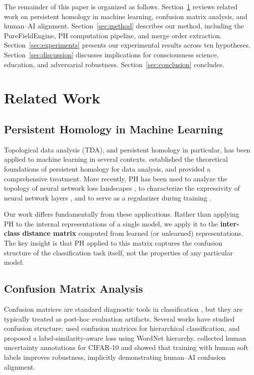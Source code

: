 \documentclass[11pt,a4paper]{article}
\begin{document}
The remainder of this paper is organized as follows. Section~\ref{sec:related} reviews related work on persistent homology in machine learning, confusion matrix analysis, and human--AI alignment. Section~\ref{sec:method} describes our method, including the PureFieldEngine, PH computation pipeline, and merge order extraction. Section~\ref{sec:experiments} presents our experimental results across ten hypotheses. Section~\ref{sec:discussion} discusses implications for consciousness science, education, and adversarial robustness. Section~\ref{sec:conclusion} concludes.

\section{Related Work}
\label{sec:related}

\subsection{Persistent Homology in Machine Learning}

Topological data analysis (TDA), and persistent homology in particular, has been applied to machine learning in several contexts. \citet{carlsson2009} established the theoretical foundations of persistent homology for data analysis, and \citet{edelsbrunner2010} provided a comprehensive treatment. More recently, PH has been used to analyze the topology of neural network loss landscapes \citep{goldfarb2020}, to characterize the expressivity of neural network layers \citep{naitzat2020}, and to serve as a regularizer during training \citep{hofer2019,chen2019}.

Our work differs fundamentally from these applications. Rather than applying PH to the internal representations of a single model, we apply it to the \textbf{inter-class distance matrix} computed from learned (or unlearned) representations. The key insight is that PH applied to this matrix captures the confusion structure of the classification task itself, not the properties of any particular model.

\subsection{Confusion Matrix Analysis}

Confusion matrices are standard diagnostic tools in classification \citep{stehman1997}, but they are typically treated as post-hoc evaluation artifacts. Several works have studied confusion structure: \citet{smith2019} used confusion matrices for hierarchical classification, and \citet{deng2010} proposed a label-similarity-aware loss using WordNet hierarchy. \citet{peterson2019} collected human uncertainty annotations for CIFAR-10 and showed that training with human soft labels improves robustness, implicitly demonstrating human--AI confusion alignment.
\end{document}
